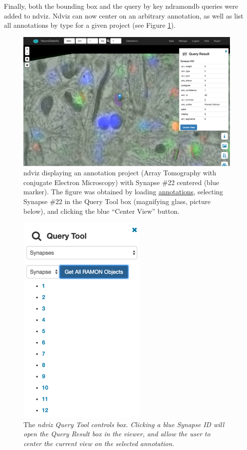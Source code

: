 \documentclass[simplex.tex]{subfiles}
\begin{document}
Finally, both the bounding box and the query by key ndramondb queries
were added to ndviz. Ndviz can now center on an arbitrary annotation, as
well as list all annotations by type for a given project (see Figure
\ref{fig:ndviz}).
\begin{figure}[h!]
\begin{cframed}
\centering
\includegraphics[width=\textwidth]{./figs/ndviz.png}
\caption{ndviz displaying an annotation project (Array Tomography with conjugate Electron Microscopy) with Synapse \#22 centered (blue marker). 
The figure was obtained by loading 
\href{http://synaptomes.neurodata.io/ndv/project/collman15_annotations/xy/1/1590/1069/0/}{annotations}, selecting Synapse \#22 in the Query Tool box (magnifying glass, picture below), and clicking the blue ``Center View'' button. 
}
\label{fig:ndviz}
\end{cframed}
\end{figure}


\begin{figure}[h!]
\begin{cframed}
\centering
\includegraphics[width=.25\textwidth]{./figs/ndviz-query.png}
\caption{The \itshape{ndviz} Query Tool controls box. Clicking a blue Synapse ID
  will open the Query Result box in the viewer, and allow the user to
  center the current view on the selected annotation.}
\label{fig:ndviz-query}
\end{cframed}
\end{figure}
\end{document}
